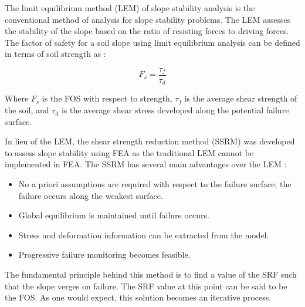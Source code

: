The limit equilibrium method (LEM) of slope stability analysis is the conventional method of analysis for slope stability problems. The LEM assesses the stability of the slope based on the ratio of resisting forces to driving forces. The factor of safety for a soil slope using limit equilibrium analysis can be defined in terms of soil strength as \citep{das_principles_2009}: 

\begin{equation}
F_s=\frac{\tau_f}{\tau_d}
\label{eqn:limeq}
\end{equation}

Where $F_s$ is the FOS with respect to strength, $\tau_f$ is the average shear strength of the soil, and $\tau_d$ is the average shear stress developed along the potential failure surface. 

In lieu of the LEM, the shear strength reduction method (SSRM) was developed to assess slope stability using FEA as the traditional LEM cannot be implemented in FEA. The SSRM has several main advantages over the LEM \citep{griffiths_slope_1999}:

\begin{itemize}
\item No a priori assumptions are required with respect to the failure surface; the failure occurs along the weakest surface.
\item Global equilibrium is maintained until failure occurs.
\item Stress and deformation information can be extracted from the model.
\item Progressive failure monitoring becomes feasible.
\end{itemize}

The fundamental principle behind this method is to find a value of the SRF such that the slope verges on failure. The SRF value at this point can be said to be the FOS. As one would expect, this solution becomes an iterative process. 
